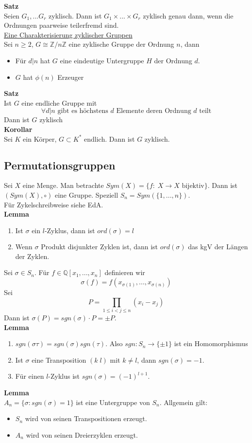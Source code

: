 \documentclass[a4paper, 12pt]{article}
\begin{document}
\textbf{Satz}\\
Seien $G_1, ... G_r$ zyklisch. Dann ist $G_1 \times ... \times G_r$ zyklisch genau dann, wenn die Ordnungen paarweise teilerfremd sind.\\
\underline{Eine Charakterisierung zyklischer Gruppen}\\
Sei $n\geq 2$, $G\cong \mathbb{Z}/n\mathbb{Z}$ eine zyklische Gruppe der Ordnung $n$, dann \begin{itemize}
	\item Für $d|n$ hat $G$ eine eindeutige Untergruppe $H$ der Ordnung $d$. 
	\item $G$ hat $\phi(n)$ Erzeuger 
\end{itemize}
\textbf{Satz}\\
Ist $G$ eine endliche Gruppe mit \[\forall d|n \text{ gibt es höchstens $d$ Elemente deren Ordnung $d$ teilt}\]
Dann ist $G$ zyklisch\\
\textbf{Korollar}\\
Sei $K$ ein Körper, $G\subset K^*$ endlich. Dann ist $G$ zyklisch. 
\subsection{Permutationsgruppen}
Sei $X$ eine Menge. Man betrachte $Sym(X) = \{f: \; X\to X \text{ bijektiv}\}$. Dann ist $(Sym(X), \circ)$ eine Gruppe. Speziell $S_n = Sym(\{1,...,n\})$.\\
Für Zykelschreibweise siehe EdA.\\
\textbf{Lemma}
\begin{enumerate}
	\item Ist $\sigma$ ein $l$-Zyklus, dann ist $ord(\sigma) = l$
	\item Wenn $\sigma$ Produkt disjunkter Zyklen ist, dann ist $ord(\sigma)$ das kgV der Längen der Zyklen.
\end{enumerate}
Sei $\sigma \in S_n$. Für $f \in \mathbb{Q}[x_1,...,x_n]$ definieren wir \[\sigma(f) = f(x_{\sigma(1)},...,x_{\sigma(n)})\]
Sei \[P = \prod_{1\leq i < j \leq n}(x_i-x_j)\] Dann ist $\sigma(P) = sgn(\sigma)\cdot P = \pm P$.\\
\textbf{Lemma}
\begin{enumerate}
	\item $sgn(\sigma \tau) = sgn(\sigma) sgn(\tau)$. Also $sgn: S_n \to \{\pm1\}$ ist ein Homomorphismus
	\item Ist $\sigma$ eine Transposition $(k\;l)$ mit $k\neq l$, dann $sgn(\sigma) = -1$.
	\item Für einen $l$-Zyklus ist $sgn(\sigma) = (-1)^{l+1}$.
\end{enumerate}
\textbf{Lemma}\\
$A_n = \{\sigma: sgn(\sigma) = 1\}$ ist eine Untergruppe von $S_n$.
Allgemein gilt: \begin{itemize}
	\item $S_n$ wird von seinen Transpositionen erzeugt.
	\item $A_n$ wird von seinen Dreierzyklen erzeugt.
\end{itemize}
\end{document}
